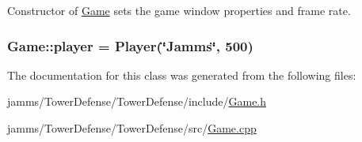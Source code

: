 Constructor of \hyperlink{class_game}{Game} sets the game window properties and frame rate. 

\hypertarget{class_game_a6e48721b0532833b99fd5615a3628792}{
\subsubsection[{player}]{ Game\+::player = {\bf Player}(\char`\"{}Jamms\char`\"{}, 500)\hspace{0.3cm}{\ttfamily [static]}}}\label{class_game_a6e48721b0532833b99fd5615a3628792}


The documentation for this class was generated from the following files\+:\begin{DoxyCompactItemize}
\item 
jamms/\+Tower\+Defense/\+Tower\+Defense/include/\hyperlink{_game_8h}{Game.\+h}\item 
jamms/\+Tower\+Defense/\+Tower\+Defense/src/\hyperlink{_game_8cpp}{Game.\+cpp}\end{DoxyCompactItemize}
